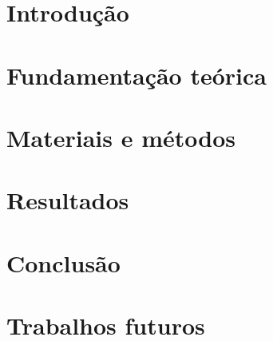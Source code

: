 \documentclass[oneside,monografia]{iftex2020}
\begin{document}
\maketitle

\chapter{Introdução}



\chapter{Fundamentação teórica}



\chapter{Materiais e métodos}



\chapter{Resultados}



\chapter{Conclusão}



\chapter{Trabalhos futuros}



\postextual

\end{document}
